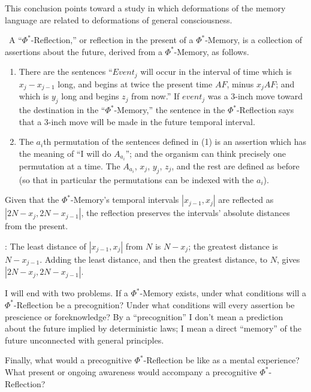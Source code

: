 This conclusion points toward a study in which deformations of the 
memory language are related to deformations of general consciousness. 

\begin{hangers}
\ A \enquote{$\Phi^*$-Reflection,} or reflection in the present of a 
$\Phi^*$-Memory, is a collection of assertions about the future, derived from a 
$\Phi^*$-Memory, as follows. 
\begin{enumerate}
	\item There are the sentences \enquote{$Event_j$ will occur in the 
interval of time which is $x_j-x_{j-1}$ long, and begins at twice the present time 
$AF$, minus $x_j AF$; and which is $y_j$ long and begins $z_j$ from now.} If $event_j$ was 
		a 3-inch move toward the destination in the \enquote{$\Phi^*$-Memory,} the sentence in the 
$\Phi^*$-Reflection says that a 3-inch move will be made in the future temporal 
interval. 
	\item The $a_i$th permutation of the sentences defined in (1) is an 
assertion which has the meaning of \enquote{I will do $A_{a_i}$}; and the organism can 
think precisely one permutation at a time. The $A_{a_i}$, $x_j$, $y_j$, $z_j$, and the rest are 
defined as before (so that in particular the permutations can be indexed with 
the $a_i$). 
\end{enumerate}
\end{hangers}
\begin{hangers}
 Given that the $\Phi^*$-Memory's temporal intervals $|x_{j-1}, x_j|$
are reflected as $|2N-x_j, 2N-x_{j-1}|$, the reflection preserves the intervals' 
absolute distances from the present. 

\proof: The least distance of $|x_{j-1}, x_j|$
from $N$ is $N-x_j$; the greatest distance is $N-x_{j-1}$. Adding the least distance, and 
then the greatest distance, to $N$, gives $|2N-x_j, 2N-x_{j-1}|$.
\end{hangers}

I will end with two problems. If a $\Phi^*$-Memory exists, under what 
conditions will a $\Phi^*$-Reflection be a precognition? Under what conditions 
will every assertion be prescience or foreknowledge? By a \enquote{precognition} I 
don't mean a prediction about the future implied by deterministic laws; I 
mean a direct \enquote{memory} of the future unconnected with general principles. 

Finally, what would a precognitive $\Phi^*$-Reflection be like as a mental 
experience? What present or ongoing awareness would accompany a 
precognitive $\Phi^*$-Reflection? 

